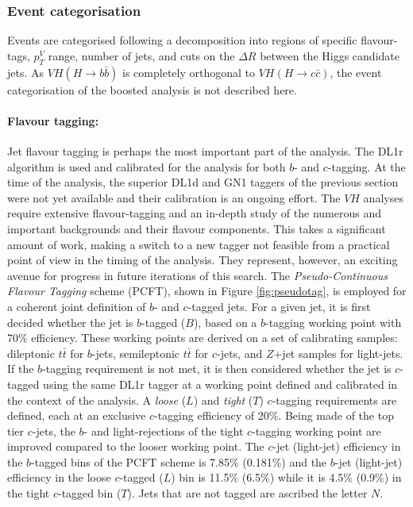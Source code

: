 \vspace{-1cm}

\subsubsection{Event categorisation}
Events are categorised following a decomposition into regions of specific flavour-tags, $p_T^V$ range, number of jets, and cuts on the $\Delta R$ between the Higgs candidate jets. As  $VH (H\rightarrow b\bar{b})$ is completely orthogonal to $VH (H\rightarrow c\bar{c})$, the event categorisation of the boosted analysis is not described here.

\paragraph{Flavour tagging:} Jet flavour tagging is perhaps the most important part of the analysis. The DL1r algorithm is used and calibrated for the analysis for both $b$- and $c$-tagging. At the time of the analysis, the superior DL1d and GN1 taggers of the previous section were not yet available and their calibration is an ongoing effort. The $VH$ analyses require extensive flavour-tagging and an in-depth study of the numerous and important backgrounds and their flavour components. This takes a significant amount of work, making a switch to a new tagger not feasible from a practical point of view in the timing of the analysis. They represent, however, an exciting avenue for progress in future iterations of this search. The \textit{Pseudo-Continuous Flavour Tagging} scheme (PCFT), shown in Figure \ref{fig:pseudotag}, is employed for a coherent joint definition of $b$- and $c$-tagged jets. For a given jet, it is first decided whether the jet is $b$-tagged ($B$), based on a $b$-tagging working point with 70\% efficiency. These working points are derived on a set of calibrating samples: dileptonic $t\bar{t}$ for $b$-jets, semileptonic $t\bar{t}$ for $c$-jets, and $Z$+jet samples for light-jets. If the $b$-tagging requirement is not met, it is then considered whether the jet is $c$-tagged using the same DL1r tagger at a working point defined and calibrated in the context of the analysis. A \textit{loose} ($L$) and \textit{tight} ($T$) $c$-tagging requirements are defined, each at an exclusive $c$-tagging efficiency of 20\%. Being made of the top tier $c$-jets, the $b$- and light-rejections of the tight $c$-tagging working point are improved compared to the looser working point. The $c$-jet (light-jet) efficiency in the $b$-tagged bins of the PCFT scheme is 7.85\% (0.181\%) and the $b$-jet (light-jet) efficiency in the loose $c$-tagged ($L$) bin is 11.5\% (6.5\%) while it is 4.5\% (0.9\%) in the tight $c$-tagged bin ($T$). Jets that are not tagged are ascribed the letter $N$. \\

